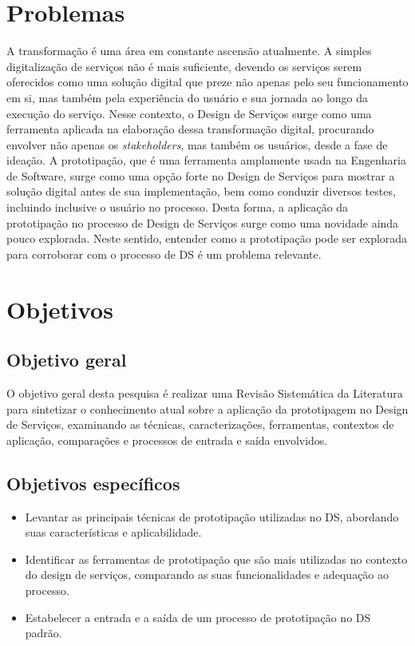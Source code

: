\section {Problemas}

A transformação é uma área em constante ascensão atualmente. A simples digitalização de serviços não é mais suficiente, devendo os serviços serem oferecidos como uma solução digital que preze não apenas pelo seu funcionamento em si, mas também pela experiência do usuário e sua jornada ao longo da execução do serviço. Nesse contexto, o Design de Serviços surge como uma ferramenta aplicada na elaboração dessa transformação digital, procurando envolver não apenas os \textit{stakeholders}, mas também os usuários, desde a fase de ideação. A prototipação, que é uma ferramenta amplamente usada na Engenharia de Software, surge como uma opção forte no Design de Serviços para mostrar a solução digital antes de sua implementação, bem como conduzir diversos testes, incluindo inclusive o usuário no processo. Desta forma, a aplicação da prototipação no processo de Design de Serviços surge como uma novidade ainda pouco explorada. Neste sentido, entender como a prototipação pode ser explorada para corroborar com o processo de DS é um problema relevante.

\section {Objetivos}
\subsection{Objetivo geral}

O objetivo geral desta pesquisa é realizar uma Revisão Sistemática da Literatura para sintetizar o conhecimento atual sobre a aplicação da prototipagem no Design de Serviços, examinando as técnicas, caracterizações, ferramentas, contextos de aplicação, comparações e processos de entrada e saída envolvidos. %

\subsection{Objetivos específicos}

\begin{itemize}
	\item Levantar as principais técnicas de prototipação utilizadas no DS, abordando suas características e aplicabilidade.
	
	\item Identificar as ferramentas de prototipação que são mais utilizadas no contexto do design de serviços, comparando as suas funcionalidades e adequação ao processo.
	
	\item Estabelecer a entrada e a saída de um processo de prototipação no DS padrão.%
\end{itemize}

